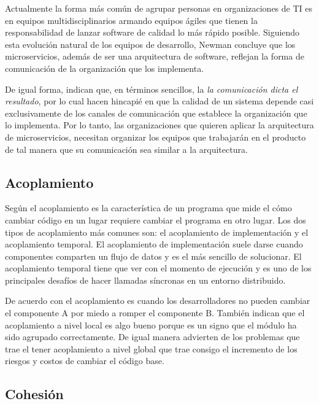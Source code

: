 Actualmente la forma más común de agrupar personas en organizaciones de TI es en equipos multidisciplinarios
armando equipos ágiles que tienen la responsabilidad de lanzar software de calidad lo más rápido posible.
Siguiendo esta evolución natural de los equipos de desarrollo, Newman concluye que los microservicios,
además de ser una arquitectura de software, reflejan la forma de comunicación de la organización
que los implementa.

De igual forma, \cite{nadareishvili2016microservice} indican que, en términos sencillos, la
{\it la comunicación dicta el resultado}, por lo cual hacen hincapié en que la calidad de un sistema
depende casi exclusivamente de los canales de comunicación que establece la organización que lo implementa.
Por lo tanto, las organizaciones que quieren aplicar la arquitectura de microservicios, necesitan
organizar los equipos que trabajarán en el producto de tal manera que su comunicación sea similar a 
la arquitectura.


\subsection{Acoplamiento}

Según \cite{newman2019monolith} el acoplamiento es la característica de un programa que mide el cómo
cambiar código en un lugar requiere cambiar el programa en otro lugar.
Los dos tipos de acoplamiento más comunes son: el acoplamiento de implementación y el acoplamiento temporal.
El acoplamiento de implementación suele darse cuando componentes comparten un flujo de datos y es el más
sencillo de solucionar.
El acoplamiento temporal tiene que ver con el momento de ejecución y es uno de los principales
desafíos de hacer llamadas síncronas en un entorno distribuido.

De acuerdo con \cite{percival2020architecture} el acoplamiento es cuando los desarrolladores no
pueden cambiar el componente A por miedo a romper el componente B. También indican que el
acoplamiento a nivel local es algo bueno porque es un signo que el módulo ha sido agrupado correctamente.
De igual manera advierten de los problemas que trae el tener acoplamiento a nivel global que trae
consigo el incremento de los riesgos y costos de cambiar el código base.


\subsection{Cohesión}

